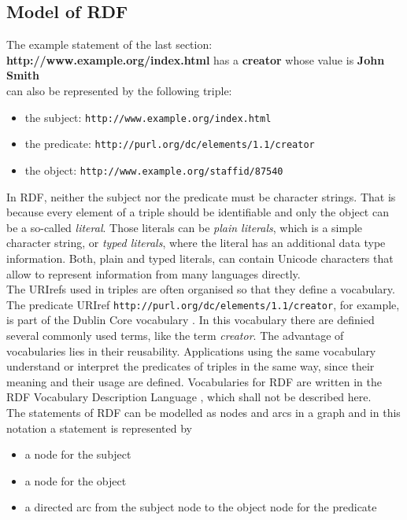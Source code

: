 \documentclass[11pt,a4paper,headsepline, bibtotoc]{scrreprt}
\begin{document}
\subsection{Model of RDF}\label{rdfmodel}
The example statement of the last section:
\\[1ex]
{\bf http://www.example.org/index.html} has a {\bf creator} whose value is {\bf John Smith}
\\[1ex]
can also be represented by the following triple:
\begin{itemize}
  \item the subject: \texttt{http://www.example.org/index.html}
  \item the predicate: \texttt{http://purl.org/dc/elements/1.1/creator}
  \item the object: \texttt{http://www.example.org/staffid/87540} 
\end{itemize}
In RDF, neither the subject nor the predicate must be character strings. That is because every element of a triple should be identifiable and only the object can be a so-called \textit{literal}. Those literals can be \textit{plain literals}, which is a simple character string, or \textit{typed literals}, where the literal has an additional data type information. Both, plain and typed literals, can contain Unicode characters that allow to represent information from many languages directly.\\
The URIrefs used in triples are often organised so that they define a vocabulary. The predicate URIref \texttt{http://purl.org/dc/elements/1.1/creator}, for example, is part of the Dublin Core vocabulary \cite{DC}. In this vocabulary there are definied several commonly used terms, like the term \textit{creator}. The advantage of vocabularies lies in their reusability. Applications using the same vocabulary understand or interpret the predicates of triples in the same way, since their meaning and their usage are defined. Vocabularies for RDF are written in the RDF Vocabulary Description Language \cite{RDF:Schema}, which shall not be described here.\\
The statements of RDF can be modelled as nodes and arcs in a graph and in this notation a statement is represented by
\begin{itemize}
    \item a node for the subject
    \item a node for the object
    \item a directed arc from the subject node to the object node for the predicate
\end{itemize}
\end{document}
